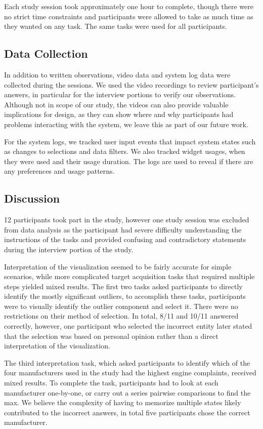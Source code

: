 Each study session took approximately one hour to complete, though there were no
strict time constraints and participants were allowed to take as much time as
they wanted on any task. The same tasks were used for all
participants. 


\subsection{Data Collection}
In addition to written observations, video data and system log data were 
collected during the sessions. We used the video recordings to review 
participant's answers, in particular for the interview portions to verify 
our observations. Although not in scope of our study, the videos can also provide 
valuable implications for design, as they can show where and why participants had 
problems interacting with the system, we leave this as part of our future work. 

For the system logs, we tracked user input events that impact system states such
as changes to selections and data filters. We also tracked widget usages, when they were used and
their usage duration. The logs are used to reveal if there are any preferences and usage 
patterns.
 

\subsection{Discussion}
12 participants took part in the study, however one study session was excluded
from data analysis as the participant had severe difficulty understanding the
instructions of the tasks and provided confusing and contradictory statements
during the interview portion of the study.

Interpretation of the \threed visualization seemed to be fairly accurate for
simple scenarios, while more complicated target acquisition tasks that required
multiple steps yielded mixed results. The first two tasks asked
participants to directly identify the mostly significant outliers, to accomplish
these tasks, participants were to visually identify the outlier \threed
component and select it. There were no restrictions on their method of
selection. In total, 8/11 and 10/11 answered correctly, however, one participant
who selected the incorrect entity later stated that the selection was based on
personal opinion rather than a direct interpretation of the visualization.

The third interpretation task, which asked participants to identify which of the four
manufacturers used in the study had the highest engine complaints, received
mixed results. To complete the task, participants had to look at each
manufacturer one-by-one, or carry out a series pairwise comparisons to find the
max. We believe the complexity of having to memorize multiple states likely
contributed to the incorrect answers, in total five participants chose the correct
manufacturer. 

